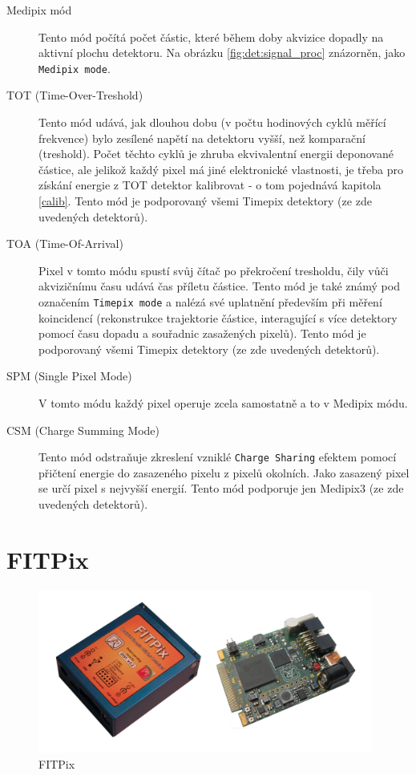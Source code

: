 \begin{description}
	\item[Medipix mód] Tento mód počítá počet částic, které během doby akvizice dopadly na aktivní plochu detektoru. Na obrázku \ref{fig:det:signal_proc} znázorněn, jako \texttt{Medipix mode}.
	\item[TOT (Time-Over-Treshold)] Tento mód udává, jak dlouhou dobu (v počtu hodinových cyklů měřící frekvence) bylo zesílené napětí na detektoru vyšší, než komparační (treshold). Počet těchto cyklů je zhruba ekvivalentní energii deponované částice, ale jelikož každý pixel má jiné elektronické vlastnosti, je třeba pro získání energie z TOT detektor kalibrovat - o tom pojednává kapitola \ref{calib}. Tento mód je podporovaný všemi Timepix detektory (ze zde uvedených detektorů).
	\item[TOA (Time-Of-Arrival)] Pixel v tomto módu spustí svůj čítač po překročení tresholdu, čily vůči akvizičnímu času udává čas příletu částice. Tento mód je také známý pod označením \texttt{Timepix mode} a nalézá své uplatnění především při měření koincidencí (rekonstrukce trajektorie částice, interagující s více detektory pomocí času dopadu a souřadnic zasažených pixelů). Tento mód je podporovaný všemi Timepix detektory (ze zde uvedených detektorů).
	\item[SPM (Single Pixel Mode)] V tomto módu každý pixel operuje zcela samostatně a to v Medipix módu.
	\item[CSM (Charge Summing Mode)] Tento mód odstraňuje zkreslení vzniklé \texttt{Charge Sharing} efektem pomocí přičtení energie do zasazeného pixelu z pixelů okolních. Jako zasazený pixel se určí pixel s nejvyšší energií. Tento mód podporuje jen Medipix3 (ze zde uvedených detektorů).

\end{description}

\section{FITPix}\label{det:fitpix}

\begin{figure}[th!]
	\begin{center}
		\includegraphics[width=11cm]{figures/fitpix.png}
		\caption{FITPix}
		\label{fig:det:fitpix}
	\end{center}
\end{figure}

